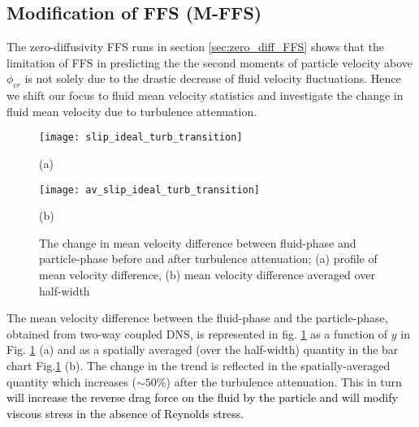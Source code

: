 \documentclass[notitlepage]{revtex4-1}
\begin{document}
\subsection{Modification of FFS (M-FFS)}
The zero-diffusivity FFS runs in section \ref{sec:zero_diff_FFS} shows that the limitation of FFS in predicting the the second moments of particle velocity above $\phi_{cr}$ is not solely due to the drastic decrease of fluid velocity fluctuations. Hence we shift our focus to fluid mean velocity statistics and investigate the change in fluid mean velocity due to turbulence attenuation.  
\begin{figure}[!]
 \texttt{[image: slip\_ideal\_turb\_transition]}
 	\caption*{(a)}    
\texttt{[image: av\_slip\_ideal\_turb\_transition]}
 	\caption*{(b)}     
\caption{The change in mean velocity difference between fluid-phase and particle-phase before and after turbulence attenuation; (a) profile of mean velocity difference, (b) mean velocity difference averaged over half-width}
\label{fig:fluid_part_vel_diff}
\end{figure}
The mean velocity difference between the fluid-phase and the particle-phase, obtained from two-way coupled DNS, is represented in fig. \ref{fig:fluid_part_vel_diff} as a function of $y$ in Fig. \ref{fig:fluid_part_vel_diff} (a) and as a spatially averaged (over the half-width) quantity in the bar chart Fig.\ref{fig:fluid_part_vel_diff} (b). The change in the trend is reflected in the spatially-averaged quantity which increases ($\sim50\%$) after the turbulence attenuation. This in turn \textcolor{black}{will increase the reverse drag force on the fluid by the particle and will modify viscous stress in the absence of Reynolds stress.} 
\end{document}
